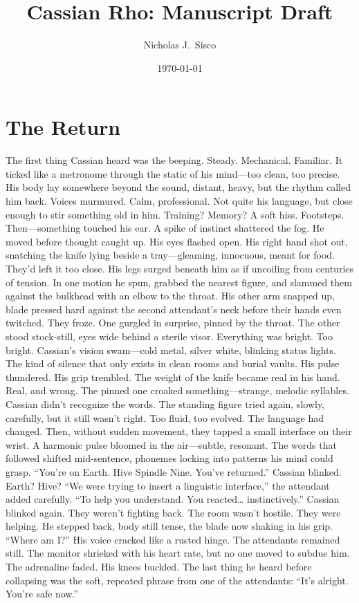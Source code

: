 \documentclass[12pt,oneside]{book}
\title{Cassian Rho: Manuscript Draft}
\author{Nicholas J.~Sisco}
\date{\today}
\begin{document}
\frontmatter
\maketitle
\tableofcontents
\mainmatter


\chapter{The Return}

The first thing Cassian heard was the beeping.
Steady. Mechanical. Familiar. It ticked like a metronome through the static of his mind—too clean, too precise. His body lay somewhere beyond the sound, distant, heavy, but the rhythm called him back.
Voices murmured. Calm, professional. Not quite his language, but close enough to stir something old in him. Training? Memory?
A soft hiss. Footsteps.
Then—something touched his ear.
A spike of instinct shattered the fog. He moved before thought caught up.
His eyes flashed open. His right hand shot out, snatching the knife lying beside a tray—gleaming, innocuous, meant for food. They'd left it too close. His legs surged beneath him as if uncoiling from centuries of tension.
In one motion he spun, grabbed the nearest figure, and slammed them against the bulkhead with an elbow to the throat. His other arm snapped up, blade pressed hard against the second attendant’s neck before their hands even twitched.
They froze. One gurgled in surprise, pinned by the throat. The other stood stock-still, eyes wide behind a sterile visor.
Everything was bright. Too bright.
Cassian’s vision swam—cold metal, silver white, blinking status lights. The kind of silence that only exists in clean rooms and burial vaults.
His pulse thundered. His grip trembled. The weight of the knife became real in his hand. Real, and wrong.
The pinned one croaked something—strange, melodic syllables. Cassian didn’t recognize the words.
The standing figure tried again, slowly, carefully, but it still wasn’t right. Too fluid, too evolved. The language had changed.
Then, without sudden movement, they tapped a small interface on their wrist. A harmonic pulse bloomed in the air—subtle, resonant. The words that followed shifted mid-sentence, phonemes locking into patterns his mind could grasp.
“You’re on Earth. Hive Spindle Nine. You’ve returned.”
Cassian blinked. Earth? Hive?
“We were trying to insert a linguistic interface,” the attendant added carefully. “To help you understand. You reacted… instinctively.”
Cassian blinked again. They weren’t fighting back. The room wasn’t hostile.
They were helping.
He stepped back, body still tense, the blade now shaking in his grip.
“Where am I?” His voice cracked like a rusted hinge.
The attendants remained still. The monitor shrieked with his heart rate, but no one moved to subdue him.
The adrenaline faded.
His knees buckled.
The last thing he heard before collapsing was the soft, repeated phrase from one of the attendants:
“It’s alright. You’re safe now.”
\end{document}
